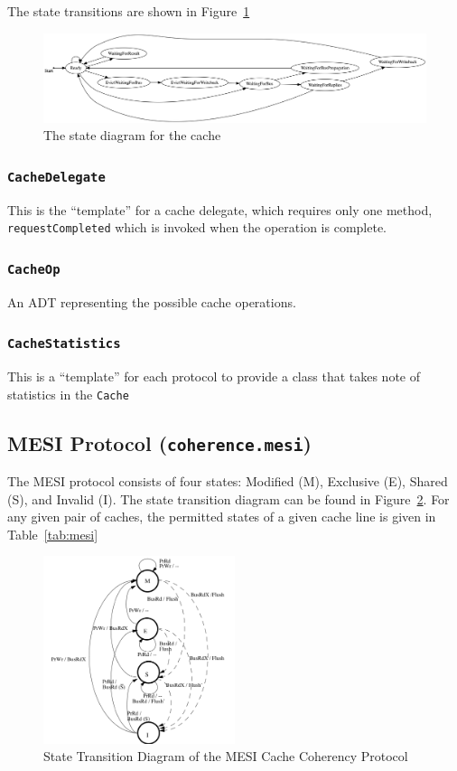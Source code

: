 \documentclass[nonacm,acmsmall,screen,11pt]{acmart}
\begin{document}
The state transitions are shown in Figure~\ref{fig:cache}

\begin{figure}[htb!]
  \centering
  \includegraphics[width=\textwidth]{cache}
  \caption{The state diagram for the cache}
  \label{fig:cache}
\end{figure}

\subsubsection{\texttt{CacheDelegate}}
This is the ``template'' for a cache delegate, which requires only one method, \texttt{requestCompleted} which is invoked when the operation is complete.

\subsubsection{\texttt{CacheOp}}
An ADT representing the possible cache operations.

\subsubsection{\texttt{CacheStatistics}}
This is a ``template'' for each protocol to provide a class that takes note of statistics in the \texttt{Cache}

\subsection{MESI Protocol (\texttt{coherence.mesi})}
The MESI protocol consists of four states: Modified (M), Exclusive (E), Shared (S), and Invalid (I).
The state transition diagram can be found in Figure~\ref{fig:mesi}.
For any given pair of caches, the permitted states of a given cache line is given in Table~\ref{tab:mesi}

\begin{figure}[htb!]
  \centering
  \includegraphics[width=0.5\textwidth]{mesi}
  \caption{State Transition Diagram of the MESI Cache Coherency Protocol}
  \label{fig:mesi}
\end{figure}
\end{document}
